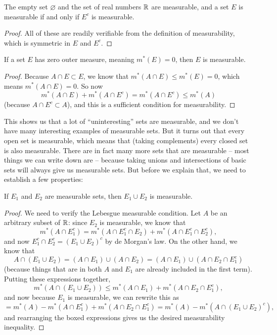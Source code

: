 \begin{lemma}
The empty set $\varnothing$ and the set of real numbers $\mathbb R$ are measurable, and a set $E$ is measurable if and only if $E^c$ is measurable.
\end{lemma}
\begin{proof}
All of these are readily verifiable from the definition of measurability, which is symmetric in $E$ and $E^c$. 
\end{proof}

\begin{proposition}
If a set $E$ has zero outer measure, meaning $m^\ast(E) = 0$, then $E$ is measurable.
\end{proposition}
\begin{proof}
Because $A \cap E \subset E$, we know that $m^\ast(A \cap E) \le m^\ast(E) = 0$, which means $m^\ast(A \cap E) = 0$. So now 
\[
    m^\ast(A \cap E) + m^\ast(A \cap E^c) = m^\ast(A \cap E^c) \le m^\ast(A)
\]
(because $A \cap E^c \subset A$), and this is a sufficient condition for measurability.
\end{proof} 

This shows us that a lot of ``uninteresting'' sets are measurable, and we don't have many interesting examples of measurable sets. But it turns out that every open set is measurable, which means that (taking complements) every closed set is also measurable. There are in fact many more sets that are measurable -- most things we can write down are -- because taking unions and intersections of basic sets will always give us measurable sets. But before we explain that, we need to establish a few properties:

\begin{proposition}
If $E_1$ and $E_2$ are measurable sets, then $E_1 \cup E_2$ is measurable.
\end{proposition}
\begin{proof}
We need to verify the Lebesgue measurable condition. Let $A$ be an arbitrary subset of $\mathbb R$: since $E_2$ is measurable, we know that 
\[
    m^\ast(A \cap E_1^c) = m^\ast(A \cap E_1^c \cap E_2) + m^\ast(A \cap E_1^c \cap E_2^c),
\]  
and now $E_1^c \cap E_2^c = (E_1 \cup E_2)^c$ by de Morgan's law. On the other hand, we know that 
\[
    A \cap (E_1 \cup E_2) = (A \cap E_1) \cup (A \cap E_2) = (A \cap E_1) \cup (A \cap E_2 \cap E_1^c)
\]
(because things that are in both $A$ and $E_1$ are already included in the first term). Putting these expressions together, 
\[
    \boxed{m^\ast(A \cap (E_1 \cup E_2))} \le m^\ast(A \cap E_1) + m^\ast(A \cap E_2 \cap E_1^c),
\]
and now because $E_1$ is measurable, we can rewrite this as 
\[
    = m^\ast(A) - m^\ast(A \cap E_1^c) + m^\ast(A \cap E_2 \cap E_1^c) = \boxed{m^\ast(A) - m^\ast(A \cap (E_1 \cup E_2)^c)},
\]
and rearranging the boxed expressions gives us the desired measurability inequality.
\end{proof}

